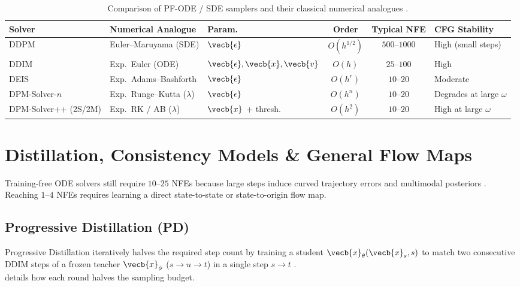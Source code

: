 \documentclass[../../../../master.tex]{subfiles}
\begin{document}
\begin{table}[htbp]
  \centering
  \small
  \begin{tabularx}{\textwidth}{@{}l l l c c X@{}}
    \toprule
    \textbf{Solver} & \textbf{Numerical Analogue} & \textbf{Param.} & \textbf{Order} & \textbf{Typical NFE} & \textbf{CFG Stability} \\
    \midrule
    DDPM & Euler--Maruyama (SDE) & $\vecb{\epsilon}$ & $O(h^{1/2})$ & $500$--$1000$ & High (small steps) \\
    DDIM & Exp.\ Euler (ODE) & $\vecb{\epsilon}, \vecb{x}, \vecb{v}$ & $O(h)$ & $25$--$100$ & High \\
    DEIS & Exp.\ Adams--Bashforth & $\vecb{\epsilon}$ & $O(h^r)$ & $10$--$20$ & Moderate \\
    DPM-Solver-$n$ & Exp.\ Runge--Kutta ($\lambda$) & $\vecb{\epsilon}$ & $O(h^n)$ & $10$--$20$ & Degrades at large $\omega$ \\
    DPM-Solver++ (2S/2M) & Exp.\ RK / AB ($\lambda$) & $\vecb{x}$ + thresh. & $O(h^2)$ & $10$--$20$ & High at large $\omega$ \\
    \bottomrule
  \end{tabularx}
  \caption{Comparison of PF-ODE / SDE samplers and their classical numerical analogues .}
  \label{tab:dsolver:solvers}
\end{table}

\section{Distillation, Consistency Models \& General Flow Maps}
\label{sec:dsolver:distillation}

Training-free ODE solvers still require $10$--$25$ NFEs because large steps induce curved trajectory errors and multimodal posteriors . Reaching $1$--$4$ NFEs requires learning a direct state-to-state or state-to-origin flow map.

\subsection{Progressive Distillation (PD)}

Progressive Distillation iteratively halves the required step count by training a student $\vecb{x}_\theta(\vecb{x}_s, s)$ to match two consecutive DDIM steps of a frozen teacher $\vecb{x}_\phi$ ($s \to u \to t$) in a single step $s \to t$ .\\
 details how each round halves the sampling budget.
\end{document}
